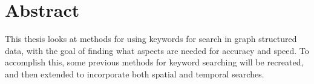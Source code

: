 \section*{Abstract}
This thesis looks at methods for using keywords for search in graph structured data, with the goal of finding what aspects are needed for accuracy and speed. To accomplish this, some previous methods for keyword searching will be recreated, and then extended to incorporate both spatial and temporal searches. 